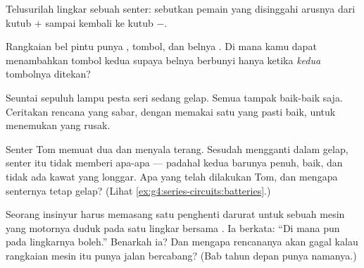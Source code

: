 \begin{exercise}[$\star$]\label{exo:g4:series-circuits:7}
Telusurilah lingkar sebuah senter: sebutkan pemain yang disinggahi
arusnya dari kutub $+$  sampai kembali ke kutub $-$.
\end{exercise}

\begin{exercise}[$\star$]\label{exo:g4:series-circuits:8}
Rangkaian bel pintu punya , tombol, dan belnya .
Di mana kamu dapat menambahkan tombol kedua supaya belnya berbunyi
hanya ketika \emph{kedua} tombolnya ditekan?
\end{exercise}

\begin{exercise}[$\star$]\label{exo:g4:series-circuits:9}
Seuntai sepuluh lampu pesta seri sedang gelap. Semua  tampak
baik-baik saja. Ceritakan rencana yang sabar, dengan memakai satu
 yang pasti baik, untuk menemukan  yang rusak.
\end{exercise}

\begin{exercise}[$\star\star$]\label{exo:g4:series-circuits:10}
Senter Tom memuat dua  dan menyala terang. Sesudah mengganti
 dalam gelap, senter itu tidak memberi apa-apa --- padahal
kedua  barunya penuh,  baik, dan tidak ada kawat yang
longgar. Apa yang telah dilakukan Tom, dan mengapa senternya tetap
gelap? (Lihat \cref{ex:g4:series-circuits:batteries}.)
\end{exercise}

\begin{exercise}[$\star\star$]\label{exo:g4:series-circuits:11}
Seorang insinyur harus memasang satu  penghenti darurat untuk
sebuah mesin yang motornya duduk pada satu lingkar bersama .
Ia berkata: ``Di mana pun pada lingkarnya boleh.'' Benarkah ia? Dan
mengapa rencananya akan gagal kalau rangkaian mesin itu punya jalan
bercabang? (Bab tahun depan punya namanya.)
\end{exercise}
